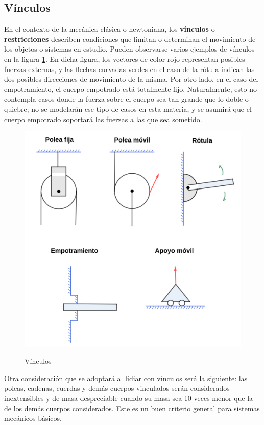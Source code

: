 \documentclass{article}
\begin{document}
\subsection{Vínculos}

En el contexto de la mecánica clásica o newtoniana, los \textbf{vínculos} o \textbf{restricciones} describen condiciones que limitan o determinan el movimiento de los objetos o sistemas en estudio. Pueden observarse varios ejemplos de vínculos en la figura \ref{fig:constraints}. En dicha figura, los vectores de color rojo representan posibles fuerzas externas, y las flechas curvadas verdes en el caso de la rótula indican las dos posibles direcciones de movimiento de la misma. Por otro lado, en el caso del empotramiento, el cuerpo empotrado está totalmente fijo. Naturalmente, esto no contempla casos donde la fuerza sobre el cuerpo sea tan grande que lo doble o quiebre; no se modelarán ese tipo de casos en esta materia, y se asumirá que el cuerpo empotrado soportará las fuerzas a las que sea sometido.

\begin{figure}[ht]
\centering
\caption{Vínculos}
\includegraphics[scale=0.7]{../../common/img/62.01/theory/08-dynamics-constraints.png}
\label{fig:constraints}
\end{figure}

Otra consideración que se adoptará al lidiar con vínculos será la siguiente: las poleas, cadenas, cuerdas y demás cuerpos vinculados serán considerados inextensibles y de masa despreciable cuando su masa sea 10 veces menor que la de los demás cuerpos considerados. Este es un buen criterio general para sistemas mecánicos básicos.
\end{document}
